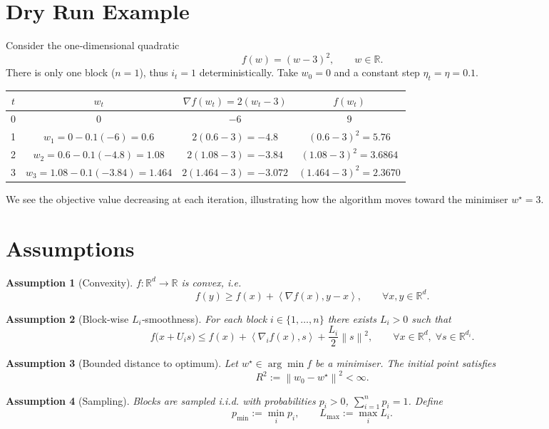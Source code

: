 \documentclass[11pt]{article}
\newtheorem{assumption}{Assumption}
\newcommand{\R}{\mathbb{R}}
\newcommand{\norm}[1]{\left\|#1\right\|}
\newcommand{\inner}[2]{\left\langle #1,#2 \right\rangle}
\begin{document}
\section*{Dry Run Example}
Consider the one‑dimensional quadratic
\[
f(w)= (w-3)^2 ,\qquad w\in\R .
\]
There is only one block ($n=1$), thus $i_t=1$ deterministically.
Take $w_0=0$ and a constant step $\eta_t=\eta=0.1$.

\begin{center}
\begin{tabular}{c|c|c|c}
$t$ & $w_t$ & $\nabla f(w_t)=2(w_t-3)$ & $f(w_t)$\\ \hline
0 & $0$ & $-6$ & $9$\\
1 & $w_1 = 0-0.1(-6)=0.6$ & $2(0.6-3)=-4.8$ & $(0.6-3)^2=5.76$\\
2 & $w_2 = 0.6-0.1(-4.8)=1.08$ & $2(1.08-3)=-3.84$ & $(1.08-3)^2=3.6864$\\
3 & $w_3 = 1.08-0.1(-3.84)=1.464$ & $2(1.464-3)=-3.072$ & $(1.464-3)^2=2.3670$\\
\end{tabular}
\end{center}
We see the objective value decreasing at each iteration, illustrating how the algorithm moves toward the minimiser $w^\star=3$.

\newpage
\section*{Assumptions}
\begin{assumption}[Convexity]\label{as:convex}
$f:\R^{d}\to\R$ is convex, i.e.
\[
f(y)\ge f(x)+\inner{\nabla f(x)}{y-x},\qquad\forall x,y\in\R^{d}.
\]
\end{assumption}

\begin{assumption}[Block‑wise $L_i$‑smoothness]\label{as:smooth}
For each block $i\in\{1,\dots ,n\}$ there exists $L_i>0$ such that
\[
f\bigl(x+U_i s\bigr)\le 
f(x)+\inner{\nabla_i f(x)}{s}+\frac{L_i}{2}\norm{s}^2,
\qquad\forall x\in\R^{d},\; \forall s\in\R^{d_i}.
\tag{2}
\]
\end{assumption}

\begin{assumption}[Bounded distance to optimum]\label{as:bounded}
Let $w^\star\in\arg\min f$ be a minimiser. The initial point satisfies
\[
R^2:=\norm{w_0-w^\star}^2<\infty .
\]
\end{assumption}

\begin{assumption}[Sampling]\label{as:sampling}
Blocks are sampled i.i.d. with probabilities $p_i>0$, $\sum_{i=1}^n p_i=1$.
Define
\[
p_{\min}:=\min_i p_i,\qquad L_{\max}:=\max_i L_i .
\]
\end{assumption}
\end{document}
